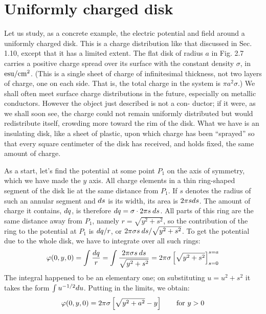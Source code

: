 \section{Uniformly charged disk}

Let us study, as a concrete example, the electric potential and field
around a uniformly charged disk. This is a charge distribution like
that discussed in Sec. 1.10, except that it has a limited extent. The
flat disk of radius $a$ in Fig. 2.7 carries a positive charge spread over its
surface with the constant density $\sigma$, in $\textup{esu}/\textup{cm}^2$. (This is a single sheet
of charge of infinitesimal thickness, not two layers of charge, one on
each side. That is, the total charge in the system is $\pi a^2\sigma$.) We shall
often meet surface charge distributions in the future, especially on
metallic conductors. However the object just described is not a con-
ductor; if it were, as we shall soon see, the charge could not remain
uniformly distributed but would redistribute itself, crowding more
toward the rim of the disk. What we have is an insulating disk, like
a sheet of plastic, upon which charge has been ``sprayed'' so that every
square centimeter of the disk has received, and holds fixed, the same
amount of charge.

As a start, let's find the potential at some point $P_1$ on the axis of
symmetry, which we have made the $y$ axis. All charge elements in a
thin ring-shaped segment of the disk lie at the same distance from $P_1$.
If $s$ denotes the radius of such an annular segment and $d s$ is its width,
its area is $2\pi sd s$. The amount of charge it contains, $d q$, is therefore 
$d q = \sigma\cdot 2\pi s \:d s$. All parts of this ring are the same distance away
from $P_1$, namely $r = \sqrt{y^2+s^2}$, so the contribution of the ring to the
potential at $P_1$ is $d q/r$, or $2\pi\sigma s\:d s/\sqrt{y^2+s^2}$. To get the potential
due to the whole disk, we have to integrate over all such rings:
\begin{equation}
  \varphi(0,y,0) = \int \frac{d q}{r} = \int \frac{2\pi\sigma s\:d s}{\sqrt{y^2+s^2}}
       =2\pi\sigma\left[\sqrt{y^2+s^2}\right]_{s=0}^{s=a}
\end{equation}
The integral happened to be an elementary one; on substituting
$u=u^2+s^2$ it takes the form $\int u^{-1/2}d u$. Putting in the limits, we
obtain:
\begin{equation}
  \varphi(0,y,0) = 2\pi\sigma\left[\sqrt{y^2+a^2}-y\right] \qquad \text{for $y>0$}
\end{equation}

